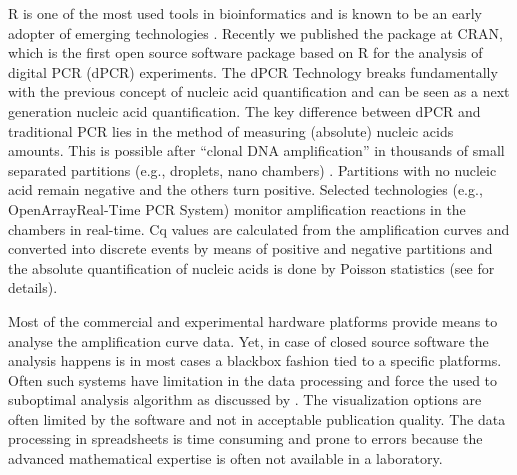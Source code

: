 R is one of the most used tools in bioinformatics and is known to be an early 
adopter of emerging technologies \citep{pabinger_2014}. Recently we published 
the  package at CRAN, which is the first open source software 
package based on R for the analysis of digital PCR (dPCR) experiments. The dPCR 
Technology breaks fundamentally with the previous concept of nucleic acid 
quantification and can be seen as a next generation nucleic acid quantification. 
The key difference between dPCR and traditional PCR lies in the method of 
measuring (absolute) nucleic acids amounts. This is possible after ``clonal DNA 
amplification'' in thousands of small separated partitions (e.g., droplets, nano 
chambers) \citep{huggett_2013, milbury_2014, morley_2014}. Partitions with no 
nucleic acid remain negative and the others turn positive. Selected technologies 
(e.g., OpenArray\textregistered Real-Time PCR System) monitor amplification 
reactions in the chambers in real-time. Cq values are calculated from the 
amplification curves and converted into discrete events by means of positive and 
negative partitions and the absolute quantification of nucleic acids is done by 
Poisson statistics (see  for details).

Most of the commercial and experimental hardware platforms provide means to 
analyse the amplification curve data. Yet, in case of closed source software the 
analysis happens is in most cases a blackbox fashion tied to a specific 
platforms. Often such systems have limitation in the data processing and force 
the used to suboptimal analysis algorithm as discussed by \citet{ruijter_2013}. 
The visualization options are often limited by the software and not in 
acceptable publication quality. The data processing in spreadsheets is time 
consuming and prone to errors because the advanced mathematical expertise is 
often not available in a laboratory.

